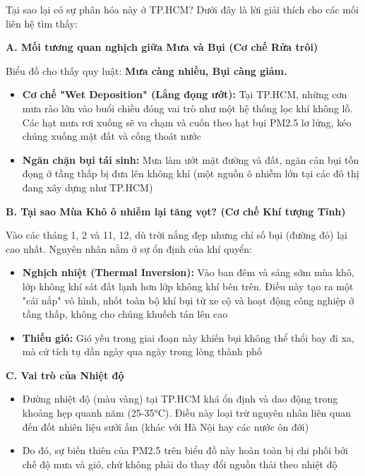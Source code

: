 \documentclass[12pt,a4paper]{article}
\begin{document}
Tại sao lại có sự phân hóa này ở TP.HCM? Dưới đây là lời giải thích cho các mối liên hệ tìm thấy:

\textbf{A. Mối tương quan nghịch giữa Mưa và Bụi (Cơ chế Rửa trôi)}

Biểu đồ cho thấy quy luật: \textbf{Mưa càng nhiều, Bụi càng giảm.}

\begin{itemize}
    \item \textbf{Cơ chế "Wet Deposition" (Lắng đọng ướt):} Tại TP.HCM, những cơn mưa rào lớn vào buổi chiều đóng vai trò như một hệ thống lọc khí không lồ. Các hạt mưa rơi xuống sẽ va chạm và cuốn theo hạt bụi PM2.5 lơ lửng, kéo chúng xuống mặt đất và cống thoát nước
    
    \item \textbf{Ngăn chặn bụi tái sinh:} Mưa làm ướt mặt đường và đất, ngăn cản bụi tồn đọng ở tầng thấp bị đưa lên không khí (một nguồn ô nhiễm lớn tại các đô thị đang xây dựng như TP.HCM)
\end{itemize}

\textbf{B. Tại sao Mùa Khô ô nhiễm lại tăng vọt? (Cơ chế Khí tượng Tĩnh)}

Vào các tháng 1, 2 và 11, 12, dù trời nắng đẹp nhưng chỉ số bụi (đường đỏ) lại cao nhất. Nguyên nhân nằm ở sự ổn định của khí quyển:

\begin{itemize}
    \item \textbf{Nghịch nhiệt (Thermal Inversion):} Vào ban đêm và sáng sớm mùa khô, lớp không khí sát đất lạnh hơn lớp không khí bên trên. Điều này tạo ra một "cái nắp" vô hình, nhốt toàn bộ khí bụi từ xe cộ và hoạt động công nghiệp ở tầng thấp, không cho chúng khuếch tán lên cao
    
    \item \textbf{Thiếu gió:} Gió yếu trong giai đoạn này khiến bụi không thể thổi bay đi xa, mà cứ tích tụ dần ngày qua ngày trong lòng thành phố
\end{itemize}

\textbf{C. Vai trò của Nhiệt độ}

\begin{itemize}
    \item Đường nhiệt độ (màu vàng) tại TP.HCM khá ổn định và dao động trong khoảng hẹp quanh năm (25-35°C). Điều này loại trừ nguyên nhân liên quan đến đốt nhiên liệu sưởi ấm (khác với Hà Nội hay các nước ôn đới)
    
    \item Do đó, sự biến thiên của PM2.5 trên biểu đồ này hoàn toàn bị chi phối bởi chế độ mưa và gió, chứ không phải do thay đổi nguồn thải theo nhiệt độ
\end{itemize}
\end{document}
